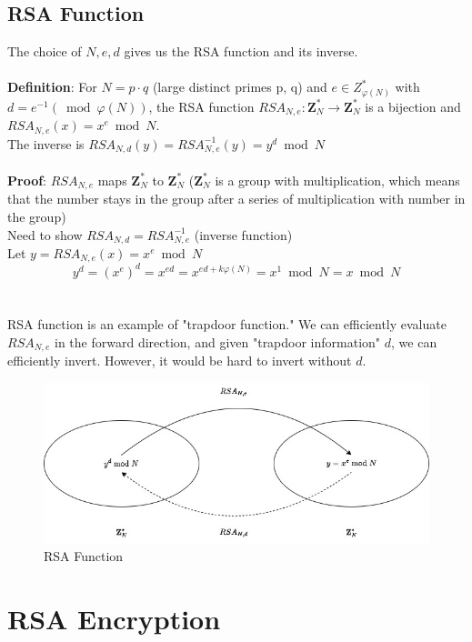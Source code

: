 \documentclass{scribe}
\begin{document}
\subsection{RSA Function}
The choice of $N, e, d$ gives us the RSA function and its inverse.
\\\\
\textbf{Definition}: For $N=p \cdot q$ (large distinct primes p, q) and $e \in Z_{\varphi(N)}^*$ with $d = e^{-1} (\bmod \varphi(N))$, the RSA function $RSA _{N,e}: \mathbf{Z}_N^* \rightarrow \mathbf{Z}_N^*$ is a bijection and $RSA _{N,e}(x) = x^e \bmod N $.
\\
The inverse is $RSA _{N,d}(y) = RSA _{N,e}^{-1}(y) = y^d \bmod N$
\\\\
\textbf{Proof}: $RSA_{N,e}$ maps $\mathbf{Z}_N^*$ to $\mathbf{Z}_N^*$ ($\mathbf{Z}_N^*$ is a group with multiplication, which means that the number stays in the group after a series of multiplication with number in the group)
\\
Need to show $RSA _{N,d}= RSA _{N,e}^{-1}$ (inverse function)
\\
Let  $ y  = RSA _{N,e}(x) = x ^e \bmod N$
\[ y ^d = (x^e)^d = x^{ed}  = x^{ed + k \varphi(N)} = x^1 \bmod N = x \bmod N\]
\\\\
RSA function is an example of "trapdoor function." We can efficiently evaluate $RSA_{N,e}$ in the forward direction, and given "trapdoor information" $d$, we can efficiently invert. However, it would be hard to invert without $d$.
\begin{figure}[H]
    \centering
    \includegraphics[scale=0.5]{rsa_function.jpg}
    \caption{RSA Function}
\end{figure}
\vspace{10mm}
\section{RSA Encryption}
\end{document}
